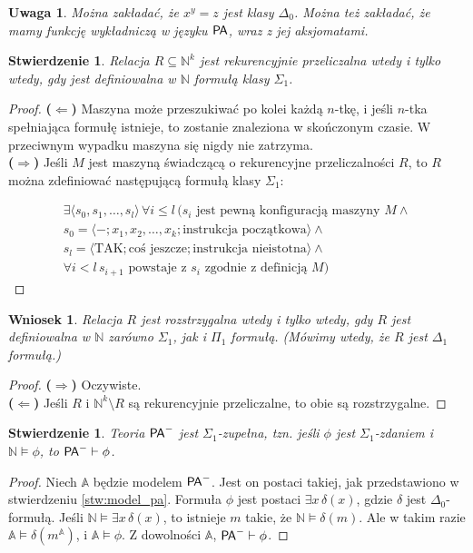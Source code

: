 \documentclass{article}
\newcommand{\N}{\mathbb{N}}
\newcommand{\A}{\mathbb{A}}
\theoremstyle{plain}
\newtheorem{stw}[thm]{Stwierdzenie}
\newtheorem{wn}[thm]{Wniosek}
\newtheorem{uw}[thm]{Uwaga}
\theoremstyle{definition}
\theoremstyle{remark}
\newcommand{\PA}{\mathsf{P \mkern-1.9mu A}}
\begin{document}
\begin{uw}
	 Można zakładać, że $x^y=z$ jest klasy $\Delta_0$.
	 Można też zakładać, że mamy funkcję wykładniczą w języku $\PA$, wraz z jej aksjomatami.
\end{uw}

\begin{stw}
	Relacja $R \subseteq \N^k$ jest \emph{rekurencyjnie przeliczalna} wtedy i tylko wtedy, gdy jest definiowalna w $\N$ formułą klasy $\Sigma_1$.
\end{stw}
\begin{proof}
        \textbf{($\Leftarrow$)} Maszyna może przeszukiwać po kolei każdą $n$-tkę, i jeśli $n$-tka spełniająca formułę istnieje, to zostanie znaleziona w skończonym czasie.
	W przeciwnym wypadku maszyna się nigdy nie zatrzyma.
	\\\textbf{($\Rightarrow$)} Jeśli $M$ jest maszyną świadczącą o rekurencyjne przeliczalności $R$, to $R$ można zdefiniować następującą formułą klasy $\Sigma_1$:


\begin{gather*}
	\exists \langle s_0, s_1, \ldots, s_l  \rangle \, \forall i \leq l \, (s_i \text{ jest pewną konfiguracją maszyny } M \wedge \\
	s_0 = \langle -; x_1, x_2, \ldots, x_k; \text{instrukcja początkowa}  \rangle \wedge\\
s_l = \langle \text{TAK}; \text{coś jeszcze}; \text{instrukcja nieistotna} \rangle \wedge \\
\forall i < l \, s_{i+1} \text{ powstaje z } s_i \text{ zgodnie z definicją  } M )
\end{gather*}
\end{proof}

\begin{wn}
	 Relacja $R$ jest rozstrzygalna wtedy i tylko wtedy, gdy $R$ jest definiowalna w $\N$ zarówno $\Sigma_1$, jak i $\Pi_1$ formułą.
	 (Mówimy wtedy, że $R$ jest $\Delta_1$ formułą.)
\end{wn}
\begin{proof}
	 \textbf{($\Rightarrow$)} Oczywiste.
	 \\\textbf{($\Leftarrow$)} Jeśli $R$ i $\N^k \setminus R$ są rekurencyjnie przeliczalne, to obie są rozstrzygalne.
\end{proof}
\begin{stw}
	 Teoria $\PA^-$ jest $\Sigma_1$-zupełna, tzn. jeśli $\phi$ jest $\Sigma_1$-zdaniem i $\N \models \phi$, to $\PA^- \vdash \phi$.
\end{stw}
\begin{proof}
	Niech $\mathbb{A}$ będzie modelem $\PA^-$.
	Jest on postaci takiej, jak przedstawiono w stwierdzeniu \ref{stw:model_pa}.
	Formuła $\phi$ jest postaci $\exists x \, \delta(x)$, gdzie $\delta$ jest $\Delta_0$-formułą.
	Jeśli $\N \models \exists x \, \delta(x)$, to istnieje $m$ takie, że $\N \models \delta(m)$.
	Ale w takim razie $\A \models \delta(m^{\mathbb{A}})$, i $\A \models \phi$.
	Z dowolności $\mathbb{A}$, $\PA^- \vdash \phi$.
\end{proof} %
\end{document}
